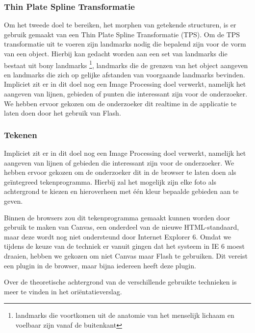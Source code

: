 \subsubsection{Thin Plate Spline Transformatie}
Om het tweede doel te bereiken, het morphen van getekende structuren, is er gebruik gemaakt van een Thin Plate Spline Transformatie (TPS). Om de TPS transformatie uit te voeren zijn landmarks nodig die bepalend zijn voor de vorm van een object. Hierbij kan gedacht worden aan een set van landmarks die bestaat uit bony landmarks \footnote{landmarks die voortkomen uit de anatomie van het menselijk lichaam en voelbaar zijn vanaf de buitenkant}, landmarks die de grenzen van het object aangeven en landmarks die zich op gelijke afstanden van voorgaande landmarks bevinden. 
Impliciet zit er in dit doel nog een Image Processing doel verwerkt, namelijk het aangeven van lijnen, gebieden of punten die interessant zijn voor de onderzoeker. We hebben ervoor gekozen om de onderzoeker dit realtime in de applicatie te laten doen door het gebruik van Flash.


\subsubsection{Tekenen}
Impliciet zit er in dit doel nog een Image Processing doel verwerkt, namelijk het aangeven van lijnen of gebieden die interessant zijn voor de onderzoeker. We hebben ervoor gekozen om de onderzoeker dit in de browser te laten doen als ge\"{i}ntegreed tekenprogramma. Hierbij zal het mogelijk zijn elke foto als achtergrond te kiezen en hieroverheen met \'{e}\'{e}n kleur bepaalde gebieden aan te geven.

Binnen de browsers zou dit tekenprogramma gemaakt kunnen worden door gebruik te maken van Canvas, een onderdeel van de nieuwe HTML-standaard, maar deze wordt nog niet ondersteund door Internet Explorer 6. Omdat we tijdens de keuze van de techniek er vanuit gingen dat het systeem in IE 6 moest draaien, hebben we gekozen om niet Canvas maar Flash te gebruiken. Dit vereist een plugin in de browser, maar bijna iedereen heeft deze plugin.

Over de theoretische achtergrond van de verschillende gebruikte technieken is meer te vinden in het ori\"{e}ntatieverslag.
